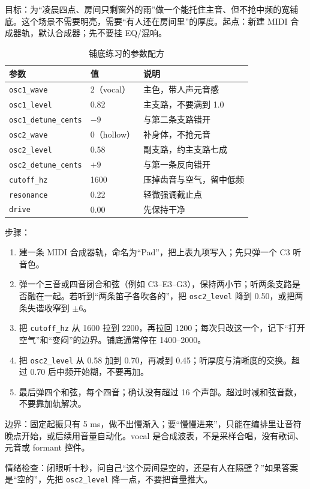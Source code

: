 \begin{exercise}
目标：为“凌晨四点、房间只剩窗外的雨”做一个能托住主音、但不抢中频的宽铺底。这个场景不需要明亮，需要“有人还在房间里”的厚度。起点：新建 MIDI 合成器轨，默认合成器；先不要挂 EQ/混响。

\begin{table}[htbp]
\centering
\small
\begin{tabular}{@{}lll@{}}
\hline
参数 & 值 & 说明 \\
\hline
\texttt{osc1\_wave} & 2（vocal） & 主色，带人声元音感 \\
\texttt{osc1\_level} & 0.82 & 主支路，不要满到 1.0 \\
\texttt{osc1\_detune\_cents} & $-9$ & 与第二条支路错开 \\
\texttt{osc2\_wave} & 0（hollow） & 补身体，不抢元音 \\
\texttt{osc2\_level} & 0.58 & 副支路，约主支路七成 \\
\texttt{osc2\_detune\_cents} & $+9$ & 与第一条反向错开 \\
\texttt{cutoff\_hz} & 1600 & 压掉齿音与空气，留中低频 \\
\texttt{resonance} & 0.22 & 轻微强调截止点 \\
\texttt{drive} & 0.00 & 先保持干净 \\
\hline
\end{tabular}
\caption{铺底练习的参数配方}
\label{tab:pad-recipe}
\end{table}

步骤：

\begin{enumerate}
  \item 建一条 MIDI 合成器轨，命名为“Pad”，把上表九项写入；先只弹一个 C3 听音色。
  \item 弹一个三音或四音闭合和弦（例如 C3–E3–G3），保持两小节；听两条支路是否融在一起。若听到“两条笛子各吹各的”，把 \texttt{osc2\_level} 降到 0.50，或把两条失谐收窄到 $\pm6$。
  \item 把 \texttt{cutoff\_hz} 从 1600 拉到 2200，再拉回 1200；每次只改这一个，记下“打开空气”和“变闷”的边界。铺底通常停在 1400–2000。
  \item 把 \texttt{osc2\_level} 从 0.58 加到 0.70，再减到 0.45；听厚度与清晰度的交换。超过 0.70 后中频开始糊，不要再加。
  \item 最后弹四个和弦，每个四音；确认没有超过 16 个声部。超过时减和弦音数，不要靠加轨解决。
\end{enumerate}

边界：固定起振只有 5 ms，做不出慢渐入；要“慢慢进来”，只能在编排里让音符晚点开始，或后续用音量自动化。vocal 是合成波表，不是采样合唱，没有歌词、元音或 formant 控件。

情绪检查：闭眼听十秒，问自己“这个房间是空的，还是有人在隔壁？”如果答案是“空的”，先把 \texttt{osc2\_level} 降一点，不要把音量推大。

\end{exercise}

